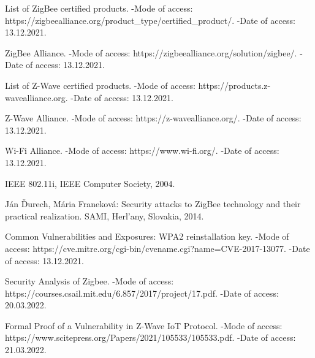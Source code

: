 \newpage
 	
	 \begin{thebibliography}{1}
	 	
	 	 List of ZigBee certified products. -Mode of access: 
	 	\newline https://zigbeealliance.org/product\_type/certified\_product/. -Date of access: 13.12.2021.
	 	
	 	 ZigBee Alliance. -Mode of access: 
	 	\newline https://zigbeealliance.org/solution/zigbee/. -Date of access: 13.12.2021.
	 	
	 	 List of Z-Wave certified products. -Mode of access: 
	 	\newline https://products.z-wavealliance.org. -Date of access: 13.12.2021.
	 	
	 	 Z-Wave Alliance. -Mode of access: 
	 	\newline https://z-wavealliance.org/. -Date of access: 13.12.2021.
	 	
	 	 Wi-Fi Alliance. -Mode of access: 
	 	\newline https://www.wi-fi.org/. -Date of access: 13.12.2021.
	 	
	 	 IEEE 802.11i, IEEE Computer Society, 2004.
	 	
	 	 Ján Ďurech, Mária Franeková: Security attacks to ZigBee technology and their practical realization. 
	 	SAMI,  Herl’any, Slovakia, 2014.
	 	
	 	 Common Vulnerabilities and Exposures: WPA2 reinstallation key. -Mode of access: 
	    https://cve.mitre.org/cgi-bin/cvename.cgi?name=CVE-2017-13077.  \newline -Date of access: 13.12.2021.
	    
	     Security Analysis of Zigbee. -Mode of access: \newline
	    https://courses.csail.mit.edu/6.857/2017/project/17.pdf. -Date of access: 20.03.2022.
	    
	     Formal Proof of a Vulnerability in Z-Wave IoT Protocol. -Mode of access: \newline
	    https://www.scitepress.org/Papers/2021/105533/105533.pdf. -Date of access: 21.03.2022.
	    

\end{thebibliography}
